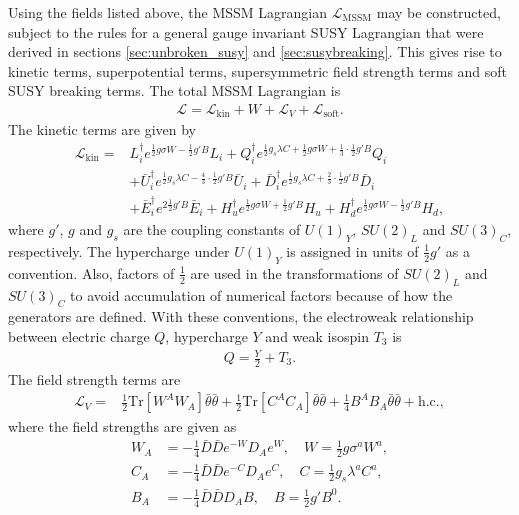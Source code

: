 \documentclass[twoside,english]{uiofysmaster}
\begin{document}
Using the fields listed above, the MSSM Lagrangian $\mathcal{L}_\mathrm{MSSM}$ may be constructed, subject to the rules for a general gauge invariant SUSY Lagrangian that were derived in sections \ref{sec:unbroken_susy} and \ref{sec:susybreaking}. This gives rise to kinetic terms, superpotential terms, supersymmetric field strength terms and soft SUSY breaking terms. The total MSSM Lagrangian is
\begin{align}
	\mathcal{L} = \mathcal{L}_\mathrm{kin} + W + \mathcal{L}_V + \mathcal{L}_\mathrm{soft}.
\end{align}
The kinetic terms are given by
\begin{align}
	\mathcal{L}_\mathrm{kin} = &L_i^\dag e^{\frac{1}{2}g\sigma W - \frac{1}{2}g'B} L_i + Q_i^\dag e^{\frac{1}{2}g_s \lambda C + \frac{1}{2}g\sigma W + \frac{1}{3}\cdot \frac{1}{2}g'B}Q_i\nonumber \\
	&+ \bar U_i^\dag e^{\frac{1}{2}g_s \lambda C - \frac{4}{3}\cdot \frac{1}{2}g'B}\bar U_i + \bar D_i^\dag e^{\frac{1}{2}g_s \lambda C + \frac{2}{3}\cdot \frac{1}{2}g'B}\bar D_i \\
	&+ \bar E_i^\dag e^{2\frac{1}{2}g'B}\bar E_i + H_u^\dag e^{\frac{1}{2}g\sigma W + \frac{1}{2} g' B} H_u + H_d^\dag e^{\frac{1}{2}g\sigma W - \frac{1}{2}g'B} H_d,\nonumber
\end{align}
where $g'$, $g$ and $g_s$ are the coupling constants of $U(1)_Y$, $SU(2)_L$ and $SU(3)_C$, respectively. The hypercharge under $U(1)_Y$ is assigned in units of $\frac{1}{2}g'$ as a convention. Also, factors of $\frac{1}{2}$ are used in the transformations of $SU(2)_L$ and $SU(3)_C$ to avoid accumulation of numerical factors because of how the generators are defined. With these conventions, the electroweak relationship between electric charge $Q$, hypercharge $Y$ and weak isospin $T_3$ is
\begin{align}
	Q = \frac{Y}{2} + T_3.
\end{align}
The field strength terms are 
\begin{align}
	\mathcal{L}_V = &\frac{1}{2}\mathrm{Tr} \left[ W^A W_A \right] \bar\theta\bar\theta + \frac{1}{2}\mathrm{Tr} \left[ C^A C_A \right] \bar\theta\bar\theta + \frac{1}{4}B^A B_A \bar\theta\bar\theta + \mathrm{h.c.},
\end{align}
where the field strengths are given as
\begin{align}
	W_A &= -\frac{1}{4}\bar D \bar D e^{-W} D_A e^W, \quad 	W = \frac{1}{2}g\sigma^a W^a,\\
	C_A &= -\frac{1}{4}\bar D \bar D e^{-C} D_A e^C,  \quad	C = \frac{1}{2}g_s \lambda^a C^a,\\
	B_A &= -\frac{1}{4}\bar D \bar D D_A B,  \quad			B = \frac{1}{2}g' B^0.
\end{align}
\end{document}
